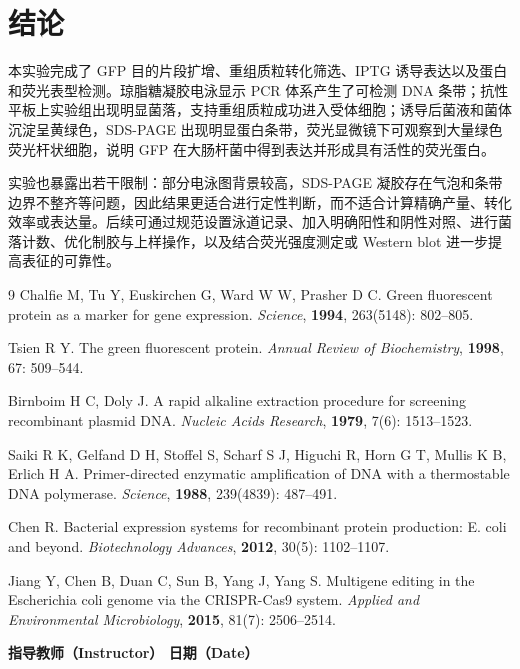 \documentclass[a4paper]{article}
\newcommand{\zihaoWu}{\fontsize{10.5pt}{16pt}\selectfont}
\begin{document}
\section{结论}
\vspace{-0.5em}

本实验完成了 GFP 目的片段扩增、重组质粒转化筛选、IPTG 诱导表达以及蛋白和荧光表型检测。琼脂糖凝胶电泳显示 PCR 体系产生了可检测 DNA 条带；抗性平板上实验组出现明显菌落，支持重组质粒成功进入受体细胞；诱导后菌液和菌体沉淀呈黄绿色，SDS-PAGE 出现明显蛋白条带，荧光显微镜下可观察到大量绿色荧光杆状细胞，说明 GFP 在大肠杆菌中得到表达并形成具有活性的荧光蛋白。

实验也暴露出若干限制：部分电泳图背景较高，SDS-PAGE 凝胶存在气泡和条带边界不整齐等问题，因此结果更适合进行定性判断，而不适合计算精确产量、转化效率或表达量。后续可通过规范设置泳道记录、加入明确阳性和阴性对照、进行菌落计数、优化制胶与上样操作，以及结合荧光强度测定或 Western blot 进一步提高表征的可靠性。

\vspace{3em}

{\footnotesize
	\begin{thebibliography}{9}
		Chalfie M, Tu Y, Euskirchen G, Ward W W, Prasher D C.
		Green fluorescent protein as a marker for gene expression.
		\textit{Science}, \textbf{1994}, 263(5148): 802--805.

		Tsien R Y.
		The green fluorescent protein.
		\textit{Annual Review of Biochemistry}, \textbf{1998}, 67: 509--544.

		Birnboim H C, Doly J.
		A rapid alkaline extraction procedure for screening recombinant plasmid DNA.
		\textit{Nucleic Acids Research}, \textbf{1979}, 7(6): 1513--1523.

		Saiki R K, Gelfand D H, Stoffel S, Scharf S J, Higuchi R, Horn G T, Mullis K B, Erlich H A.
		Primer-directed enzymatic amplification of DNA with a thermostable DNA polymerase.
		\textit{Science}, \textbf{1988}, 239(4839): 487--491.

		Chen R.
		Bacterial expression systems for recombinant protein production: E. coli and beyond.
		\textit{Biotechnology Advances}, \textbf{2012}, 30(5): 1102--1107.

		Jiang Y, Chen B, Duan C, Sun B, Yang J, Yang S.
		Multigene editing in the Escherichia coli genome via the CRISPR-Cas9 system.
		\textit{Applied and Environmental Microbiology}, \textbf{2015}, 81(7): 2506--2514.
	\end{thebibliography}
}

\vspace*{\fill}
\noindent{\zihaoWu 评语（Remarks）：}

\vspace{2em}

\begin{center}
	{\zihaoWu\bfseries 指导教师（Instructor）\hspace{8em} 日期（Date）}
\end{center}

\vspace{1.5cm}
\end{document}
